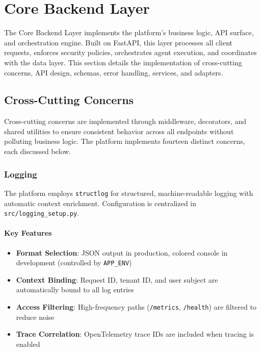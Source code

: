 
\section{Core Backend Layer}
\label{sec:core-backend}

The Core Backend Layer implements the platform's business logic, API surface, and orchestration engine. Built on FastAPI, this layer processes all client requests, enforces security policies, orchestrates agent execution, and coordinates with the data layer. This section details the implementation of cross-cutting concerns, API design, schemas, error handling, services, and adapters.

\subsection{Cross-Cutting Concerns}
\label{subsec:cross-cutting}

Cross-cutting concerns are implemented through middleware, decorators, and shared utilities to ensure consistent behavior across all endpoints without polluting business logic. The platform implements fourteen distinct concerns, each discussed below.

\subsubsection{Logging}

The platform employs \texttt{structlog} for structured, machine-readable logging with automatic context enrichment. Configuration is centralized in \texttt{src/logging\_setup.py}.

\paragraph{Key Features}
\begin{itemize}
    \item \textbf{Format Selection}: JSON output in production, colored console in development (controlled by \texttt{APP\_ENV})
    \item \textbf{Context Binding}: Request ID, tenant ID, and user subject are automatically bound to all log entries
    \item \textbf{Access Filtering}: High-frequency paths (\texttt{/metrics}, \texttt{/health}) are filtered to reduce noise
    \item \textbf{Trace Correlation}: OpenTelemetry trace IDs are included when tracing is enabled
\end{itemize}

